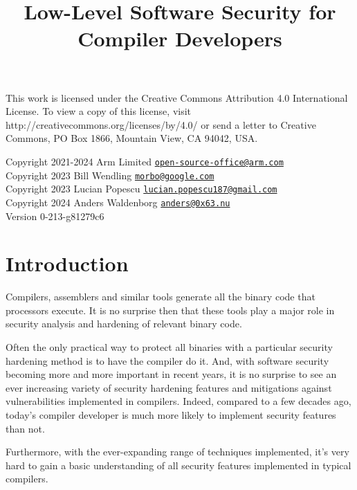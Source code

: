 \documentclass[
  a4paper,
]{report}
\title{Low-Level Software Security for Compiler Developers}
\author{}
\date{}
\begin{document}
\maketitle

\clearpage

\vspace*{\fill}
This work is licensed under the Creative Commons Attribution 4.0 International
License. To view a copy of this license, visit
http://creativecommons.org/licenses/by/4.0/ or send a letter to Creative
Commons, PO Box 1866, Mountain View, CA 94042, USA.

  Copyright 2021-2024 Arm Limited
\href{mailto:open-source-office@arm.com}{\nolinkurl{open-source-office@arm.com}}\\
  Copyright 2023 Bill Wendling
\href{mailto:morbo@google.com}{\nolinkurl{morbo@google.com}}\\
  Copyright 2023 Lucian Popescu
\href{mailto:lucian.popescu187@gmail.com}{\nolinkurl{lucian.popescu187@gmail.com}}\\
  Copyright 2024 Anders Waldenborg
\href{mailto:anders@0x63.nu}{\nolinkurl{anders@0x63.nu}}\\

Version 0-213-g81279c6
\clearpage

{
\hypersetup{linkcolor=}
\setcounter{tocdepth}{2}
\tableofcontents
}
\chapter{Introduction}\label{introduction}

Compilers, assemblers and similar tools generate all the binary code
that processors execute. It is no surprise then that these tools play a
major role in security analysis and hardening of relevant binary code.

Often the only practical way to protect all binaries with a particular
security hardening method is to have the compiler do it. And, with
software security becoming more and more important in recent years, it
is no surprise to see an ever increasing variety of security hardening
features and mitigations against vulnerabilities implemented in
compilers. Indeed, compared to a few decades ago, today's compiler
developer is much more likely to implement security features than not.

Furthermore, with the ever-expanding range of techniques implemented,
it's very hard to gain a basic understanding of all security features
implemented in typical compilers.
\end{document}
